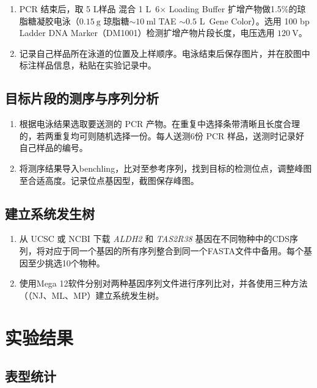 \documentclass[10pt]{article}
\newcommand{\ul}{\textmu L}
\begin{document}
\begin{enumerate}
    \item PCR 结束后，取 5 \ul 样品 混合 1 \ul \ 6$\times$ Loading Buffer 扩增产物做1.5\%的琼脂糖凝胶电泳（$\qty{0.15}{\g}$ 琼脂糖$\sim \qty{10}{\ml}$ TAE $\sim 0.5$ \ul \ Gene Color）。选用 100 bp Ladder DNA Marker（DM1001）检测扩增产物片段长度，电压选用 $\qty{120}{\V}$。
    \item 记录自己样品所在泳道的位置及上样顺序。电泳结束后保存图片，并在胶图中标注样品信息，粘贴在实验记录中。
\end{enumerate}

\subsection{目标片段的测序与序列分析}
\begin{enumerate}
    \item 根据电泳结果选取要送测的 PCR 产物。在重复中选择条带清晰且长度合理的，若两重复均可则随机选择一份。每人送测6份 PCR 样品，送测时记录好自己样品的编号。
    \item 将测序结果导入benchling，比对至参考序列，找到目标的检测位点，调整峰图至合适高度。记录位点基因型，截图保存峰图。
\end{enumerate}

\subsection{建立系统发生树}
\begin{enumerate}
    \item 从 UCSC 或 NCBI 下载 \textit{ALDH2} 和 \textit{TAS2R38} 基因在不同物种中的CDS序列，将对应于同一个基因的所有序列整合到同一个FASTA文件中备用。每个基因至少挑选10个物种。
    \item 使用Mega 12软件分别对两种基因序列文件进行序列比对，并各使用三种方法（（NJ、ML、MP）建立系统发生树。
\end{enumerate}

\section{实验结果}
\subsection{表型统计}
\end{document}
